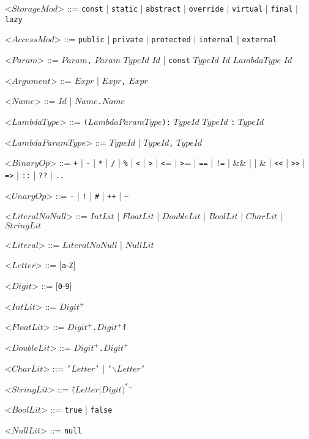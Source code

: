 \documentclass{article}
\newcommand{\gtext}[1]{<$#1$>}
\newcommand{\glit}[1]{\texttt{#1}}
\begin{document}
\begin{grammar}
	\gtext{StorageMod} ::= \glit{const} | \glit{static} | \glit{abstract} | \glit{override} | \glit{virtual} | \glit{final} | \glit{lazy}
	
	\gtext{AccessMod} ::= \glit{public} | \glit{private} | \glit{protected} | \glit{internal} | \glit{external}
	
	\gtext{Param} ::= $Param$\glit{,} $Param$ 
	\alt $TypeId$ $Id$ | \glit{const} $TypeId$ $Id$
	\alt $LambdaType$ $Id$
	
	\gtext{Argument} ::= $Expr$ | $Expr$\glit{,} $Expr$
	
	\gtext{Name} ::= $Id$ | $Name$\glit{.}$Name$	
	
	\newpage	
	
	\gtext{LambdaType} ::= \glit{(}$LambdaParamType$\glit{):} $TypeId$
	\alt $TypeId$ \glit{:} $TypeId$
	
	\gtext{LambdaParamType} ::= $TypeId$ | $TypeId$\glit{,} $TypeId$

	\gtext{BinaryOp} ::= \glit{+} | \glit{-} | \glit{*} | \glit{/} | \glit{\%} | \glit{\textless} | \glit{\textgreater} | \glit{\textless}= | \glit{\textgreater}= | \glit{==} | \glit{!=}
	\alt \glit{\textbar\textbar} | $\&\&$ | \glit{\textbar} | $\&$ | \glit{\textless\textless} | \glit{\textgreater\textgreater} | \glit{=>} | \glit{::} | \glit{??} | \glit{..}
	
	\gtext{UnaryOp} ::= \glit{-} | \glit{!} | \glit{\#} | \glit{++} | \glit{--}
	
	\gtext{LiteralNoNull}	::= $IntLit$ | $FloatLit$ | $DoubleLit$ | $BoolLit$ | $CharLit$ | $StringLit$
	
	\gtext{Literal}	::= $LiteralNoNull$ | $NullLit$
	
	\gtext{Letter} ::= [\glit{a}-\glit{Z}]
	
	\gtext{Digit} ::= [\glit{0}-\glit{9}]
	
	\gtext{IntLit} ::= $Digit^+$
	
	\gtext{FloatLit} ::= $Digit^+$\glit{.}$Digit^+$\glit{f}
	
	\gtext{DoubleLit} ::= $Digit^+$\glit{.}$Digit^+$

	\gtext{CharLit} ::= \glit{'}$Letter$\glit{'} | \glit{'$\backslash$}$Letter$\glit{'}
	
	\gtext{StringLit} ::= \glit{\"}$(Letter$|$Digit)^*$\glit{\"}	
	
	\gtext{BoolLit} ::= \glit{true} | \glit{false}
	
	\gtext{NullLit} ::= \glit{null}

\end{grammar}
\end{document}
